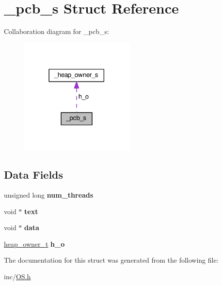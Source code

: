 \hypertarget{struct__pcb__s}{}\section{\+\_\+pcb\+\_\+s Struct Reference}
\label{struct__pcb__s}


Collaboration diagram for \+\_\+pcb\+\_\+s\+:\nopagebreak
\begin{figure}[H]
\begin{center}
\leavevmode
\includegraphics[width=165pt]{struct__pcb__s__coll__graph}
\end{center}
\end{figure}
\subsection*{Data Fields}
\begin{DoxyCompactItemize}
\item 
unsigned long {\bfseries num\+\_\+threads}\hypertarget{struct__pcb__s_a9c8ec4e7d19de58186e633e1c9a4010f}{}\label{struct__pcb__s_a9c8ec4e7d19de58186e633e1c9a4010f}

\item 
void $\ast$ {\bfseries text}\hypertarget{struct__pcb__s_ab704b53133f65b7768f5426fa4529abd}{}\label{struct__pcb__s_ab704b53133f65b7768f5426fa4529abd}

\item 
void $\ast$ {\bfseries data}\hypertarget{struct__pcb__s_a98d408faff3e9592966cee3123937713}{}\label{struct__pcb__s_a98d408faff3e9592966cee3123937713}

\item 
\hyperlink{struct__heap__owner__s}{heap\+\_\+owner\+\_\+t} {\bfseries h\+\_\+o}\hypertarget{struct__pcb__s_af8fff6a773525627aec59f37144dd950}{}\label{struct__pcb__s_af8fff6a773525627aec59f37144dd950}

\end{DoxyCompactItemize}


The documentation for this struct was generated from the following file\+:\begin{DoxyCompactItemize}
\item 
inc/\hyperlink{OS_8h}{O\+S.\+h}\end{DoxyCompactItemize}
